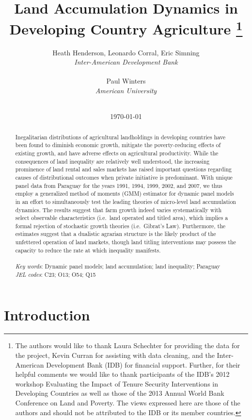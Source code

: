 \documentclass[english]{article}
\title{Land Accumulation Dynamics in Developing Country Agriculture%
\thanks{The authors would like to thank Laura Schechter for providing the
data for the project, Kevin Curran for assisting with data cleaning, and the 
Inter-American Development Bank (IDB) for financial support.
Further, for their helpful comments we would like to thank participants of 
the IDB's 2012 workshop Evaluating the Impact 
of Tenure Security Interventions in Developing Countries as well as those of the 
2013 Annual World Bank Conference on Land and Poverty.
The views expressed here are those of the authors and should not be 
attributed to the IDB or its member countries.}}
\author{
Heath Henderson, Leonardo Corral, Eric Simning\\
\textit{Inter-American Development Bank} \\
\\
Paul Winters \\
\textit{American University}
\\ \\
}
\date{\today}
\begin{document}

\begin{titlepage}
\maketitle

\begin{abstract}
Inegalitarian distributions of agricultural landholdings in developing countries
have been found to diminish economic growth, mitigate the poverty-reducing
effects of existing growth, and have adverse effects on agricultural 
productivity.
While the consequences of land inequality are relatively well understood, the 
increasing prominence of land rental and sales markets has raised 
important questions regarding causes of distributional outcomes when 
private initiative is predominant.
With unique panel data from Paraguay for the years 1991, 1994, 1999, 2002, 
and 2007, we thus employ a generalized method of moments (GMM) 
estimator for dynamic panel models in an effort to simultaneously test the 
leading theories of micro-level land accumulation dynamics. 
The results suggest that farm growth indeed varies systematically with 
select observable characteristics (i.e.\ land operated and titled area), 
which implies a formal rejection of stochastic growth theories (i.e.\
Gibrat's Law). 
Furthermore, the estimates suggest that a dualistic agrarian structure is 
the likely product of the unfettered operation of land markets, though
land titling interventions may possess the capacity to reduce the rate at 
which inequality manifests. \\
\\
\textit{Key words}: Dynamic panel models; land accumulation; 
land inequality; Paraguay \\
\textit{JEL codes}:  C23; O13; O54; Q15
\end{abstract}
\thispagestyle{empty}
\end{titlepage}
\newpage


\doublespacing


\section{Introduction}
\label{sec: intro}
\end{document}
